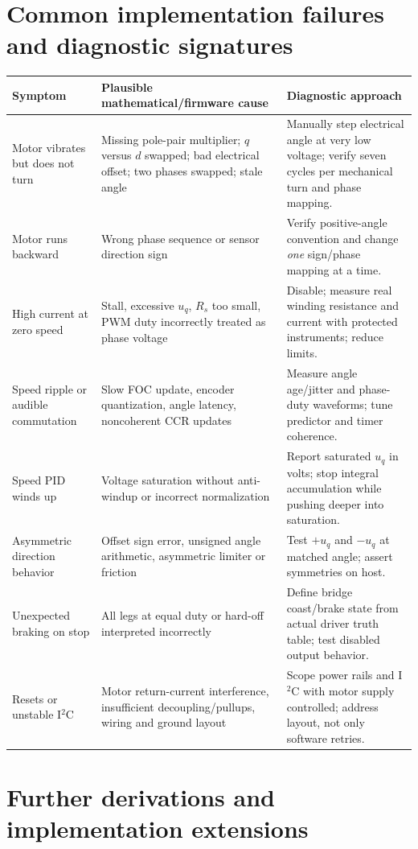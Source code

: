 \documentclass[10pt,letterpaper]{article}
\begin{document}
\section{Common implementation failures and diagnostic signatures}
\begin{longtable}{@{}p{36mm}p{67mm}p{59mm}@{}}\toprule
Symptom & Plausible mathematical/firmware cause & Diagnostic approach\\\midrule\endhead
Motor vibrates but does not turn & Missing pole-pair multiplier; $q$ versus $d$ swapped; bad electrical offset; two phases swapped; stale angle & Manually step electrical angle at very low voltage; verify seven cycles per mechanical turn and phase mapping.\\
Motor runs backward & Wrong phase sequence or sensor direction sign & Verify positive-angle convention and change \emph{one} sign/phase mapping at a time.\\
High current at zero speed & Stall, excessive $u_q$, $R_s$ too small, PWM duty incorrectly treated as phase voltage & Disable; measure real winding resistance and current with protected instruments; reduce limits.\\
Speed ripple or audible commutation & Slow FOC update, encoder quantization, angle latency, noncoherent CCR updates & Measure angle age/jitter and phase-duty waveforms; tune predictor and timer coherence.\\
Speed PID winds up & Voltage saturation without anti-windup or incorrect normalization & Report saturated $u_q$ in volts; stop integral accumulation while pushing deeper into saturation.\\
Asymmetric direction behavior & Offset sign error, unsigned angle arithmetic, asymmetric limiter or friction & Test $+u_q$ and $-u_q$ at matched angle; assert symmetries on host.\\
Unexpected braking on stop & All legs at equal duty or hard-off interpreted incorrectly & Define bridge coast/brake state from actual driver truth table; test disabled output behavior.\\
Resets or unstable I$^2$C & Motor return-current interference, insufficient decoupling/pullups, wiring and ground layout & Scope power rails and I$^2$C with motor supply controlled; address layout, not only software retries.\\
\bottomrule
\end{longtable}

\section{Further derivations and implementation extensions}
\end{document}
